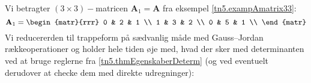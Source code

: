 \begin{example} \label{tn5.exampTrappeDet}
Vi betragter $(3 \times 3)-$matricen $\mathbf{A}_{1} = \mathbf{A}$ fra eksempel \ref{tn5.exampAmatrix33}:
\begin{equation}
\mathbf{A}_{1} =  \begin{matr}{rrr}
             0 & 2 & 1 \\
             1 & 3 & 2 \\
             0 & 5 & 1 \\
           \end{matr}
\end{equation}
Vi reducererden  til trappeform på sædvanlig måde med Gauss--Jordan rækkeoperationer og holder hele tiden øje med, hvad der sker med determinanten
ved at bruge reglerne fra \ref{tn5.thmEgenskaberDeterm} (og ved eventuelt derudover at checke dem med direkte udregninger):


\end{example}
